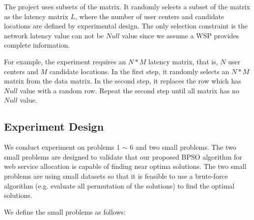 The project uses subsets of the matrix. 
It randomly selects a subset of the matrix as the latency matrix $L$, 
where the number of user centers and candidate locations are defined by experimental design. 
The only selection constraint is the network latency value can not be $Null$ value since we assume a WSP provides complete information.

For example, the experiment requires an $N * M$ latency matrix, that is, $N$ user centers and $M$ candidate locations.
In the first step, it randomly selects an $N * M$ matrix from the data matrix. In the second step, it replaces the row which has $Null$ value with a random row. 
Repeat the second step until all matrix has no $Null$ value.
% 
% 
% 
% 




\subsection{Experiment Design}
We conduct experiment on problems 1 $\sim$ 6 and two small problems.
The two small problems are designed to validate that our proposed BPSO algorithm for web service allocation is capable of finding near optima solutions.
The two small problems are using small datasets so that it is feasible to use
a brute-force algorithm (e.g. evaluate all permutation of the solutions) to find the optimal solutions.

We define the small problems as follows:

